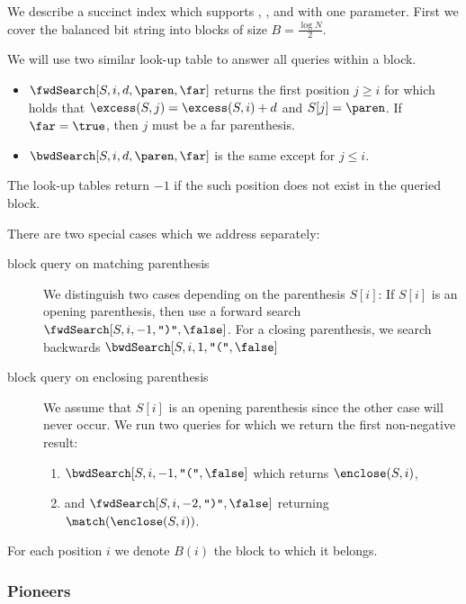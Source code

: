 
We describe a succinct index which supports \findClose{}, \findOpen{}, and \enclose{} with one parameter.
First we cover the balanced bit string into blocks of size $B = \frac{\log N}{2}$.

We will use two similar look-up table to answer all queries within a block.
\begin{itemize}
	\item $\fwdSearch[S, i, d, \paren, \far]$ returns the first position $j \ge i$ for which holds that $\excess(S, j) = \excess(S, i) + d$ and $S[j] = \paren$.
	If $\far = \true$, then $j$ must be a far parenthesis.
	\item $\bwdSearch[S, i, d, \paren, \far]$ is the same except for $j \le i$.
\end{itemize}
The look-up tables return $-1$ if the such position does not exist in the queried block.

There are two special cases which we address separately:
\begin{description}
	\item[block query on matching parenthesis]
	We distinguish two cases depending on the parenthesis $S[i]$:
	If $S[i]$ is an opening parenthesis, then use a forward search $\fwdSearch[S, i, -1, \closingParen, \false]$.
	For a closing parenthesis, we search backwards $\bwdSearch[S, i, 1, \openingParen, \false]$
	
	\item[block query on enclosing parenthesis]
	We assume that $S[i]$ is an opening parenthesis since the other case will never occur.
	We run two queries for which we return the first non-negative result:
	\begin{enumerate}
		\item $\bwdSearch[S, i, -1, \openingParen, \false]$ which returns $\enclose(S, i)$,
		\item and $\fwdSearch[S, i, -2, \closingParen, \false]$ returning $\match(\enclose(S, i))$.
	\end{enumerate}
\end{description}

For each position $i$ we denote $B(i)$ the block to which it belongs.

\subsubsection{Pioneers}

